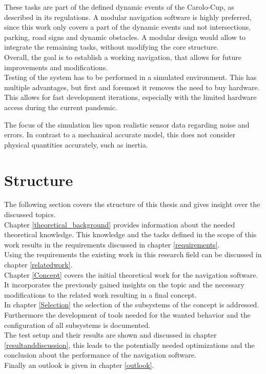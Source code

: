 These tasks are part of the defined dynamic events of the Carolo-Cup, as described in its regulations\cite{carolocup}. A modular navigation software is highly preferred, since this work only covers a part of the dynamic events and not intersections, parking, road signs and dynamic obstacles. A modular design would allow to integrate the remaining tasks, without modifying the core structure.\\

Overall, the goal is to establish a working navigation, that allows for future improvements and modifications.\\

Testing of the system has to be performed in a simulated environment. This has multiple advantages, but first and foremost it removes the need to buy hardware. This allows for fast development iterations, especially with the limited hardware access during the current pandemic.


The focus of the simulation lies upon realistic sensor data regarding noise and errors. In contrast to a mechanical accurate model, this does not consider physical quantities accurately, such as inertia.


\section{Structure}
The following section covers the structure of this thesis and gives insight over the discussed topics.\\

Chapter \ref{theoretical_background} provides information about the needed theoretical knowledge. This knowledge and the tasks defined in the scope of this work results in the requirements discussed in chapter \ref{requirements}.\\

Using the requirements the existing work in this research field can be discussed in chapter \ref{relatedwork}.\\

Chapter \ref{Concept} covers the initial theoretical work for the navigation software. It incorporates the previously gained insights on the topic and the necessary modifications to the related work resulting in a final concept.\\

In chapter \ref{Selection} the selection of the subsystems of the concept is addressed. Furthermore the development of tools needed for the wanted behavior and the configuration of all subsystems is documented.\\

The test setup and their results are shown and discussed in chapter \ref{resultanddiscussion}, this leads to the potentially needed optimizations and the conclusion about the performance of the navigation software.\\

Finally an outlook is given in chapter \ref{outlook}.
